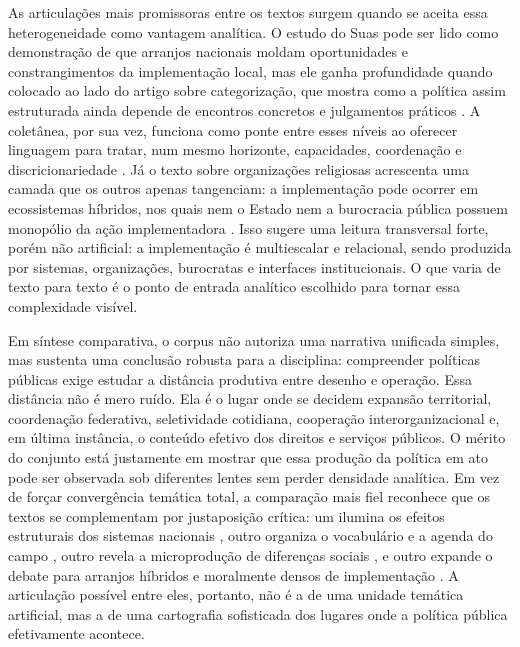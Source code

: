 \documentclass[12pt,a4paper]{article}
\begin{document}
As articulações mais promissoras entre os textos surgem quando se aceita essa heterogeneidade como vantagem analítica. O estudo do Suas pode ser lido como demonstração de que arranjos nacionais moldam oportunidades e constrangimentos da implementação local, mas ele ganha profundidade quando colocado ao lado do artigo sobre categorização, que mostra como a política assim estruturada ainda depende de encontros concretos e julgamentos práticos \parencite{bichir2020_sistemas_nacionais,lotta2020_categorizando_usuarios}. A coletânea, por sua vez, funciona como ponte entre esses níveis ao oferecer linguagem para tratar, num mesmo horizonte, capacidades, coordenação e discricionariedade \parencite{lotta2019_teorias_analises}. Já o texto sobre organizações religiosas acrescenta uma camada que os outros apenas tangenciam: a implementação pode ocorrer em ecossistemas híbridos, nos quais nem o Estado nem a burocracia pública possuem monopólio da ação implementadora \parencite{lotta2023_jesus_speaks}. Isso sugere uma leitura transversal forte, porém não artificial: a implementação é multiescalar e relacional, sendo produzida por sistemas, organizações, burocratas e interfaces institucionais. O que varia de texto para texto é o ponto de entrada analítico escolhido para tornar essa complexidade visível.

Em síntese comparativa, o corpus não autoriza uma narrativa unificada simples, mas sustenta uma conclusão robusta para a disciplina: compreender políticas públicas exige estudar a distância produtiva entre desenho e operação. Essa distância não é mero ruído. Ela é o lugar onde se decidem expansão territorial, coordenação federativa, seletividade cotidiana, cooperação interorganizacional e, em última instância, o conteúdo efetivo dos direitos e serviços públicos. O mérito do conjunto está justamente em mostrar que essa produção da política em ato pode ser observada sob diferentes lentes sem perder densidade analítica. Em vez de forçar convergência temática total, a comparação mais fiel reconhece que os textos se complementam por justaposição crítica: um ilumina os efeitos estruturais dos sistemas nacionais \parencite{bichir2020_sistemas_nacionais}, outro organiza o vocabulário e a agenda do campo \parencite{lotta2019_teorias_analises}, outro revela a microprodução de diferenças sociais \parencite{lotta2020_categorizando_usuarios}, e outro expande o debate para arranjos híbridos e moralmente densos de implementação \parencite{lotta2023_jesus_speaks}. A articulação possível entre eles, portanto, não é a de uma unidade temática artificial, mas a de uma cartografia sofisticada dos lugares onde a política pública efetivamente acontece.
\end{document}
